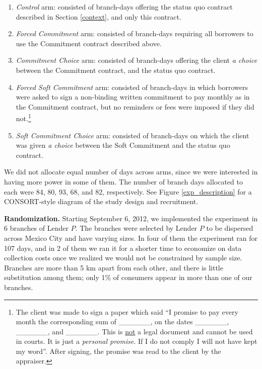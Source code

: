 \documentclass[oneside,11pt]{article}
\begin{document}
\begin{enumerate}
    \item \textit{Control} arm: consisted of branch-days offering the status quo contract described in Section \ref{context}, and only this contract. 
    \item \textit{Forced Commitment} arm: consisted of branch-days requiring all borrowers to use the Commitment contract described above.  
    \item \textit{Commitment Choice} arm: consisted of branch-days offering the client \textit{a choice} between the Commitment contract, and the status quo contract.
    \item \textit{Forced Soft Commitment} arm: consisted of branch-days in which borrowers were asked to sign a non-binding written commitment to pay monthly as in the Commitment contract, but no reminders or fees were imposed if they did not.\footnote{The client was made to sign a paper which said ``I promise to pay every month the corresponding sum of \_\_\_\_\_\_, on the dates \_\_\_\_\_\_, \_\_\_\_\_\_, and \_\_\_\_\_\_. This is \underline{not} a legal document and cannot be used in courts. It is just a \textit{personal promise}. If I do not comply I will not have kept my word''. After signing, the promise was read to the client by the appraiser.}%
    \item \textit{Soft Commitment Choice} arm: consisted of branch-days on which the client was given \textit{a choice} between the Soft Commitment and the status quo contract.
\end{enumerate}

We did not allocate equal number of days across arms, since we were interested in having more power in some of them. The number of branch days allocated to each were 84, 80, 93, 68, and 82, respectively.  See Figure \ref{exp_description} for a CONSORT-style diagram of the study design and recruitment.


\vspace{.2in}
\noindent \textbf{Randomization.}  Starting September 6, 2012, we implemented the experiment in 6 branches of Lender $P$. The branches were selected by Lender $P$ to be dispersed across Mexico City and have varying sizes. In four of them the experiment ran for 107 days, and in 2 of them we ran it for a shorter time to economize on data collection costs once we realized we would not be constrained by sample size. %
Branches are more than 5 km apart from each other, and there is little substitution among them; only 1\% of consumers appear in more than one of our branches.
\end{document}
